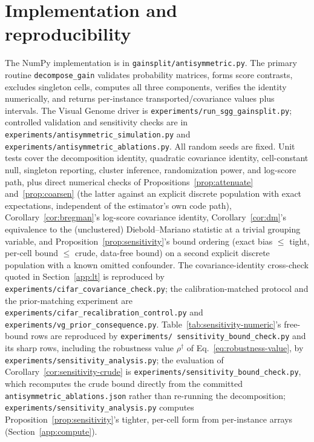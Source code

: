 \section{Implementation and reproducibility}\label{app:implementation}

The NumPy implementation is in \texttt{gainsplit/antisymmetric.py}. The primary routine
\texttt{decompose\_gain} validates probability matrices, forms score contrasts, excludes
singleton cells, computes all three components, verifies the identity numerically, and
returns per-instance transported/covariance values plus intervals. The Visual Genome
driver is \texttt{experiments/\allowbreak run\_sgg\_gainsplit.py}; controlled validation and sensitivity
checks are in \texttt{experiments/\allowbreak antisymmetric\_simulation.py} and
\texttt{experiments/\allowbreak antisymmetric\_ablations.py}. All random seeds are fixed. Unit tests
cover the decomposition identity, quadratic covariance identity, cell-constant null,
singleton reporting, cluster inference, randomization power, and log-score path, plus
direct numerical checks of Propositions~\ref{prop:attenuate} and~\ref{prop:coarsen}
(the latter against an explicit discrete population with exact expectations, independent
of the estimator's own code path), Corollary~\ref{cor:bregman}'s log-score covariance
identity, Corollary~\ref{cor:dm}'s equivalence to the (unclustered) Diebold--Mariano
statistic at a trivial grouping variable, and Proposition~\ref{prop:sensitivity}'s bound
ordering (exact bias $\le$ tight, per-cell bound $\le$ crude, data-free bound) on a second
explicit discrete population with a known omitted confounder. The covariance-identity
cross-check quoted in
Section~\ref{app:lt} is reproduced by
\texttt{experiments/\allowbreak cifar\_covariance\_check.py}; the calibration-matched
protocol and the prior-matching experiment are
\texttt{experiments/\allowbreak cifar\_recalibration\_control.py} and
\texttt{experiments/\allowbreak vg\_prior\_consequence.py}. Table~\ref{tab:sensitivity-numeric}'s
free-bound rows are reproduced by \texttt{experiments/\allowbreak
sensitivity\_bound\_check.py} and its sharp rows, including the robustness value
$\rho^\dagger$ of Eq.~\eqref{eq:robustness-value}, by
\texttt{experiments/\allowbreak sensitivity\_analysis.py}; the evaluation of
Corollary~\ref{cor:sensitivity-crude} is
\texttt{experiments/\allowbreak sensitivity\_bound\_check.py}, which recomputes the crude
bound directly from the committed \texttt{antisymmetric\_ablations.json} rather than
re-running the decomposition; \texttt{experiments/\allowbreak sensitivity\_analysis.py}
computes Proposition~\ref{prop:sensitivity}'s tighter, per-cell form from per-instance
arrays (Section~\ref{app:compute}).

